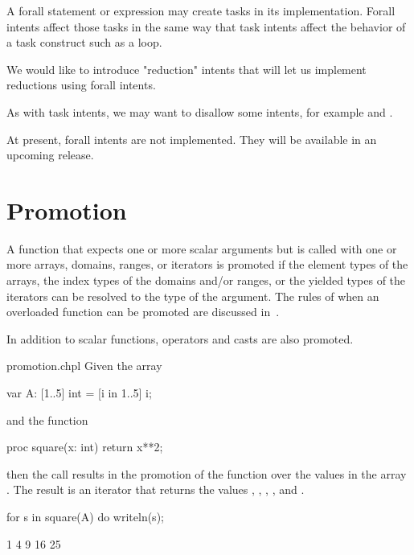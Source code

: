 \begin{rationale}
A forall statement or expression may create tasks in its implementation.
Forall intents affect those tasks in the same way that task intents
affect the behavior of a task construct such as a  loop.
\end{rationale}

\begin{future}
We would like to introduce "reduction" intents
that will let us implement reductions using forall intents.
\end{future}

\begin{future}
As with task intents, we may want to disallow some intents,
for example  and .
\end{future}

\begin{craychapel}
At present, forall intents are not implemented.
They will be available in an upcoming release.
\end{craychapel}


\section{Promotion}
\label{Promotion}

A function that expects one or more scalar arguments but is called
with one or more arrays, domains, ranges, or iterators is promoted if
the element types of the arrays, the index types of the domains and/or
ranges, or the yielded types of the iterators can be resolved to the
type of the argument.  The rules of when an overloaded function can be
promoted are discussed in~.

In addition to scalar functions, operators and casts are also
promoted.

\begin{chapelexample}{promotion.chpl}
Given the array
\begin{chapel}
var A: [1..5] int = [i in 1..5] i;
\end{chapel}
and the function
\begin{chapel}
proc square(x: int) return x**2;
\end{chapel}
then the call  results in the promotion of
the  function over the values in the array .  The
result is an iterator that returns the
values , , , , and .
\begin{chapelnoprint}
for s in square(A) do writeln(s);
\end{chapelnoprint}
\begin{chapeloutput}
1
4
9
16
25
\end{chapeloutput}
\end{chapelexample}

